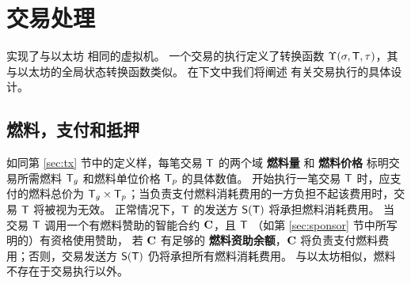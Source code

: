 

\section{交易处理}
\label{sec:tx_processing}

\name 实现了与以太坊 \cite{ETH_yellow} 相同的虚拟机。
一个交易的执行定义了转换函数 $\Upsilon(\mathbf{\sigma},\textsf{T},\tau)$，其与以太坊的全局状态转换函数类似。
在下文中我们将阐述 \name 有关交易执行的具体设计。

\subsection{燃料，支付和抵押}
\label{subsec:gas_and_pay}

如同第 \ref{sec:tx} 节中的定义样，每笔交易 $\textsf{T}$ 的两个域 {\bf 燃料量} 和 {\bf 燃料价格} 标明交易所需燃料 $\textsf{T}_g$ 和燃料单位价格 $\textsf{T}_p$ 的具体数值。
开始执行一笔交易 $\textsf{T}$ 时，应支付的燃料总价为 $\textsf{T}_g \times \textsf{T}_p$；当负责支付燃料消耗费用的一方负担不起该费用时，交易 $\textsf{T}$ 将被视为无效。
正常情况下，$\textsf{T}$ 的发送方 $\mathsf{S}{\left({\textsf{T}} \right)}$ 将承担燃料消耗费用。
当交易 $\textsf{T}$ 调用一个有燃料赞助的智能合约 $\mathbf{C}$，且 $\textsf{T}$ （如第 \ref{sec:sponsor} 节中所写明的）有资格使用赞助，
若 $\mathbf{C}$ 有足够的 \textbf{燃料资助余额}，$\mathbf{C}$ 将负责支付燃料费用；否则，交易发送方 $\mathsf{S}{\left({\textsf{T}} \right)}$ 仍将承担所有燃料消耗费用。
与以太坊相似，燃料不存在于交易执行以外。


